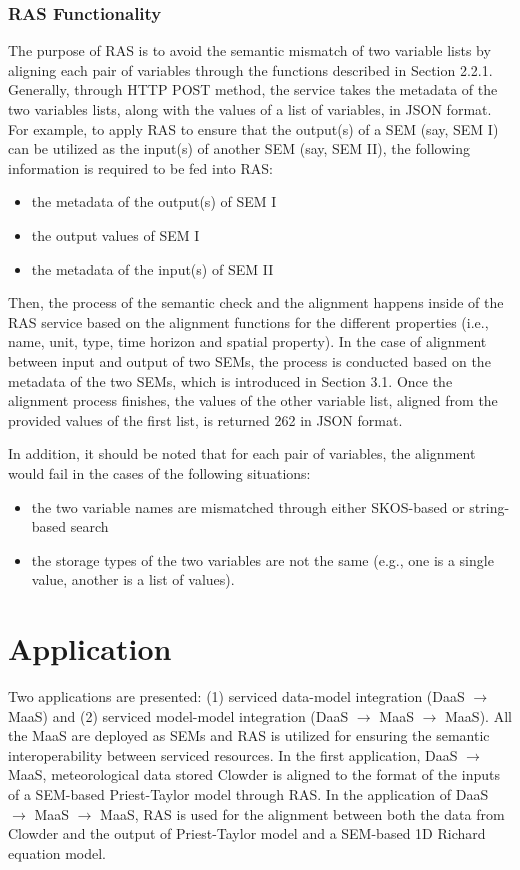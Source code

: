 \documentclass[review]{elsarticle}
\begin{document}
\subsubsection{RAS Functionality} The purpose of RAS is to avoid the semantic mismatch of two variable lists by aligning each pair of variables through the functions described in Section 2.2.1. Generally, through HTTP POST method, the service takes the metadata of the two variables lists, along with the values of a list of variables, in JSON format. For example, to apply RAS to ensure that the output(s) of a SEM (say, SEM I) can be utilized as the input(s) of another SEM (say, SEM II), the following information is required to be fed into RAS: 
\begin{itemize}
\item the metadata of the output(s) of SEM I
\item the output values of SEM I
\item the metadata of the input(s) of SEM II
\end{itemize}
Then, the process of the semantic check and the alignment happens inside of the RAS service based on the alignment functions for the different properties (i.e., name, unit, type, time horizon and spatial property). In the case of alignment between input and output of two SEMs, the process is conducted based on the metadata of the two SEMs, which is introduced in Section 3.1. Once the alignment process finishes, the values of the other variable list, aligned from the provided values of the first list, is returned 262 in JSON format.

In addition, it should be noted that for each pair of variables, the alignment would fail in the cases of the following situations:
\begin{itemize}
\item the two variable names are mismatched through either SKOS-based or string-based search
\item the storage types of the two variables are not the same (e.g., one is a single value, another is a list of values).
\end{itemize}

\section{Application} Two applications are presented: (1) serviced data-model integration (DaaS $\rightarrow$ MaaS) and (2) serviced model-model integration (DaaS $\rightarrow$ MaaS $\rightarrow$ MaaS). All the MaaS are deployed as SEMs and RAS is utilized for ensuring the semantic interoperability between serviced resources.  In the first application, DaaS $\rightarrow$ MaaS, meteorological data stored Clowder is aligned to the format of the inputs of a SEM-based Priest-Taylor model through RAS. In the application of DaaS $\rightarrow$ MaaS $\rightarrow$ MaaS, RAS is used for the alignment between both the data from Clowder and the output of Priest-Taylor model and a SEM-based 1D Richard equation model. 
\end{document}
